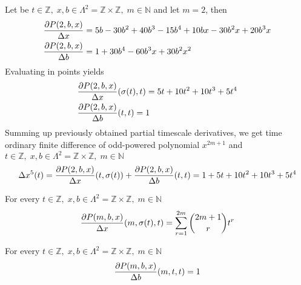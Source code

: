 \begin{examp}
    \label{time_scale_z_example_2}
    Let be $t\in\mathbb{Z}, \;x,b\in\Lambda^2 = \mathbb{Z} \times \mathbb{Z}, \; m\in\mathbb{N}$
    and let $m=2$, then
    \begin{align*}
        &\frac{\partial P ( 2, b, x )}{\Delta x}                = 5 b - 30 b^2 + 40 b^3 - 15 b^4 + 10 b x - 30 b^2 x + 20 b^3 x \\
        &\frac{\partial P ( 2, b, x )}{\Delta b}                = 1 + 30 b^4 - 60 b^3 x + 30 b^2 x^2
    \end{align*}
    Evaluating in points yields
    \begin{align*}
        &\frac{\partial P ( 2, b, x )}{\Delta x} (\sigma(t), t) = 5 t + 10 t^2 + 10 t^3 + 5 t^4 \\
        &\frac{\partial P ( 2, b, x )}{\Delta b} (t, t)         = 1
    \end{align*}
    Summing up previously obtained partial timescale derivatives, we get time ordinary finite difference of odd-powered
    polynomial $x^{2m+1}$ and $t\in\mathbb{Z}, \;x,b\in\Lambda^2 = \mathbb{Z} \times \mathbb{Z}, \; m\in\mathbb{N}$
    \begin{align*}
        \Delta x^{5} (t)
        = \frac{\partial P ( 2, b, x )}{\Delta x} (t, \sigma(t))
        + \frac{\partial P ( 2, b, x )}{\Delta b} (t, t)
        = 1 + 5 t + 10 t^2 + 10 t^3 + 5 t^4
    \end{align*}
\end{examp}
\begin{cor}
    \label{time_scale_z_corollary_1}
    For every $t\in\mathbb{Z}, \; x,b\in\Lambda^2 = \mathbb{Z} \times \mathbb{Z}, \; m\in\mathbb{N}$
    \begin{align*}
        \frac{\partial P ( m, b, x )}{\Delta x} (m, \sigma(t), t)
        = \sum_{r=1}^{2m} \binom{2m+1}{r} t^{r}
    \end{align*}
\end{cor}
\begin{cor}
    \label{time_scale_z_corollary_2}
    For every $t\in\mathbb{Z}, \; x,b\in\Lambda^2 = \mathbb{Z} \times \mathbb{Z}, \; m\in\mathbb{N}$
    \begin{align*}
        \frac{\partial P ( m, b, x )}{\Delta b} (m, t, t) = 1
    \end{align*}
\end{cor}
